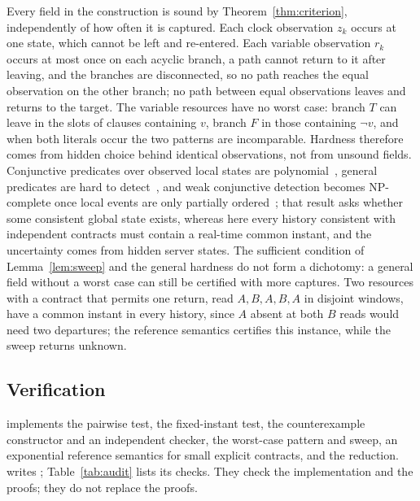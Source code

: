 Every field in the construction is sound by Theorem~\ref{thm:criterion},
independently of how often it is captured. Each clock observation $z_k$ occurs
at one state, which cannot be left and re-entered. Each variable observation
$r_k$ occurs at most once on each acyclic branch, a path cannot return to it
after leaving, and the branches are disconnected, so no path reaches the equal
observation on the other branch; no path between equal observations leaves
and returns to the target. The variable resources have no worst case: branch
$T$ can leave in the slots of clauses containing $v$, branch $F$ in those
containing $\lnot v$, and when both literals occur the two patterns are
incomparable. Hardness therefore comes from hidden choice behind identical
observations, not from unsound fields. Conjunctive predicates over observed
local states are polynomial~\cite{garg1996}, general predicates are hard to
detect~\cite{chase1998}, and weak conjunctive detection becomes NP-complete
once local events are only partially ordered~\cite{tarafdar1998}; that result
asks whether some consistent global state exists, whereas here every history
consistent with independent contracts must contain a real-time common instant,
and the uncertainty comes from hidden server states. The sufficient condition
of Lemma~\ref{lem:sweep} and the general hardness do not form a dichotomy: a
general field without a worst case can still be certified with more captures.
Two resources with a contract that permits one return, read $A,B,A,B,A$ in
disjoint windows, have a common instant in every history, since $A$ absent at
both $B$ reads would need two departures; the reference semantics certifies
this instance, while the sweep returns unknown.

\subsection{Verification}
 implements the pairwise test, the fixed-instant
test, the counterexample constructor and an independent checker, the
worst-case pattern and sweep, an exponential reference semantics for small
explicit contracts, and the reduction. 
writes ; Table~\ref{tab:audit} lists
its checks. They check the implementation and the proofs; they do not
replace the proofs.

